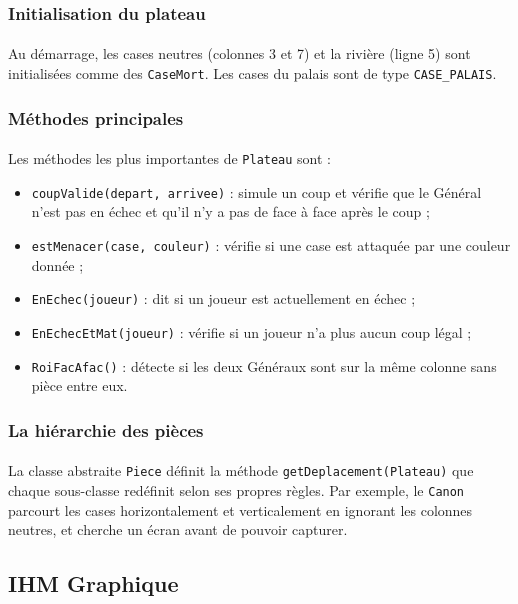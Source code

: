 \subsubsection{Initialisation du plateau}
\paragraph{} Au démarrage, les cases neutres (colonnes 3 et 7) et la rivière (ligne 5) sont initialisées comme des \texttt{CaseMort}. Les cases du palais sont de type \texttt{CASE\_PALAIS}.
\subsubsection{Méthodes principales}
\paragraph{} Les méthodes les plus importantes de \texttt{Plateau} sont :
\begin{itemize}
\item \texttt{coupValide(depart, arrivee)} : simule un coup et vérifie que le Général n'est pas en échec et qu'il n'y a pas de face à face après le coup ;
\item \texttt{estMenacer(case, couleur)} : vérifie si une case est attaquée par une couleur donnée ;
\item \texttt{EnEchec(joueur)} : dit si un joueur est actuellement en échec ;
\item \texttt{EnEchecEtMat(joueur)} : vérifie si un joueur n'a plus aucun coup légal ;
\item \texttt{RoiFacAfac()} : détecte si les deux Généraux sont sur la même colonne sans pièce entre eux.
\end{itemize}
\subsubsection{La hiérarchie des pièces}
\paragraph{} La classe abstraite \texttt{Piece} définit la méthode \texttt{getDeplacement(Plateau)} que chaque sous-classe redéfinit selon ses propres règles. Par exemple, le \texttt{Canon} parcourt les cases horizontalement et verticalement en ignorant les colonnes neutres, et cherche un écran avant de pouvoir capturer.



\subsection{IHM Graphique}
